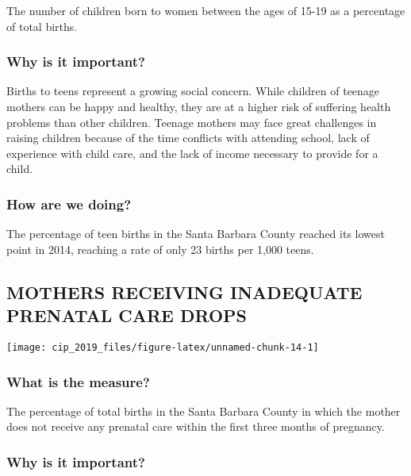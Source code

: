 \documentclass[]{book}
\theoremstyle{definition}
\theoremstyle{definition}
\theoremstyle{definition}
\theoremstyle{remark}
\begin{document}
The number of children born to women between the ages of 15-19 as a
percentage of total births.

\subsubsection*{Why is it important?}\label{why-is-it-important-4}

Births to teens represent a growing social concern. While children of
teenage mothers can be happy and healthy, they are at a higher risk of
suffering health problems than other children. Teenage mothers may face
great challenges in raising children because of the time conflicts with
attending school, lack of experience with child care, and the lack of
income necessary to provide for a child.

\subsubsection*{How are we doing?}\label{how-are-we-doing-7}

The percentage of teen births in the Santa Barbara County reached its
lowest point in 2014, reaching a rate of only 23 births per 1,000 teens.

\subsection*{MOTHERS RECEIVING INADEQUATE PRENATAL CARE
DROPS}\label{mothers-receiving-inadequate-prenatal-care-drops}

\texttt{[image: cip\_2019\_files/figure-latex/unnamed-chunk-14-1]}

\subsubsection*{What is the measure?}\label{what-is-the-measure-6}

The percentage of total births in the Santa Barbara County in which the
mother does not receive any prenatal care within the first three months
of pregnancy.

\subsubsection*{Why is it important?}\label{why-is-it-important-5}
\end{document}
